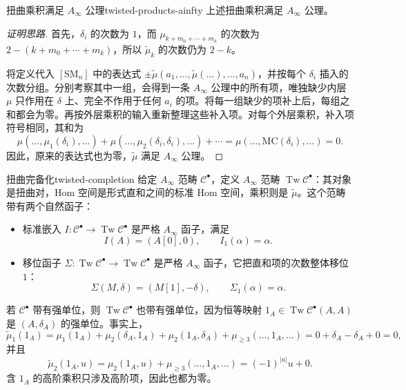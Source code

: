 \begin{lemma}{扭曲乘积满足 $A_\infty$ 公理}{twisted-products-ainfty}
上述扭曲乘积满足 $A_\infty$ 公理。
\end{lemma}
\begin{proof}[证明思路]
首先，$\delta_i$ 的次数为 $1$，而 $\mu_{k+m_0+\cdots+m_k}$ 的次数为 $2-(k+m_0+\cdots+m_k)$，所以 $\widetilde\mu_k$ 的次数仍为 $2-k$。

将定义代入 $[\mathrm{SM}_n]$ 中的表达式 $\pm\widetilde\mu(a_1,\ldots,\widetilde\mu(\ldots),\ldots,a_n)$，并按每个 $\delta_i$ 插入的次数分组。分别考察其中一组，会得到一条 $A_\infty$ 公理中的所有项，唯独缺少内层 $\mu$ 只作用在 $\delta$ 上、完全不作用于任何 $a_i$ 的项。将每一组缺少的项补上后，每组之和都会为零。再按外层乘积的输入重新整理这些补入项。对每个外层乘积，补入项符号相同，其和为
\[
  \mu(\ldots,\mu_1(\delta_i),\ldots)
  +\mu(\ldots,\mu_2(\delta_i,\delta_i),\ldots)+\cdots
  =\mu(\ldots,\mathrm{MC}(\delta_i),\ldots)=0.
\]
因此，原来的表达式也为零，$\widetilde\mu$ 满足 $A_\infty$ 公理。
\end{proof}

\begin{definition}{扭曲完备化}{twisted-completion}
给定 $A_\infty$ 范畴 $\mathcal C^\bullet$，定义 $A_\infty$ 范畴 $\operatorname{Tw}\mathcal C^\bullet$：其对象是扭曲对，Hom 空间是形式直和之间的标准 Hom 空间，乘积则是 $\widetilde\mu$。这个范畴带有两个自然函子：
\begin{itemize}
  \item 标准嵌入 $I\colon\mathcal C^\bullet\to\operatorname{Tw}\mathcal C^\bullet$ 是严格 $A_\infty$ 函子，满足
  \[
    I(A)=(A[0],0),\qquad I_1(\alpha)=\alpha.
  \]
  \item 移位函子 $\Sigma\colon\operatorname{Tw}\mathcal C^\bullet\to\operatorname{Tw}\mathcal C^\bullet$ 是严格 $A_\infty$ 函子，它把直和项的次数整体移位 $1$：
  \[
    \Sigma(M,\delta)=(M[1],-\delta),\qquad \Sigma_1(\alpha)=\alpha.
  \]
\end{itemize}
\end{definition}

\begin{note}
若 $\mathcal C^\bullet$ 带有强单位，则 $\operatorname{Tw}\mathcal C^\bullet$ 也带有强单位，因为恒等映射 $1_A\in\operatorname{Tw}\mathcal C^\bullet(A,A)$ 是 $(A,\delta_A)$ 的强单位。事实上，
\[
  \widetilde\mu_1(1_A)
  =\mu_1(1_A)+\mu_2(\delta_A,1_A)+\mu_2(1_A,\delta_A)
    +\mu_{\geq3}(\ldots,1_A,\ldots)
  =0+\delta_A-\delta_A+0=0,
\]
并且
\[
  \widetilde\mu_2(1_A,u)
  =\mu_2(1_A,u)+\mu_{\geq3}(\ldots,1_A,\ldots)
  =(-1)^{|u|}u+0.
\]
含 $1_A$ 的高阶乘积只涉及高阶项，因此也都为零。
\end{note}

